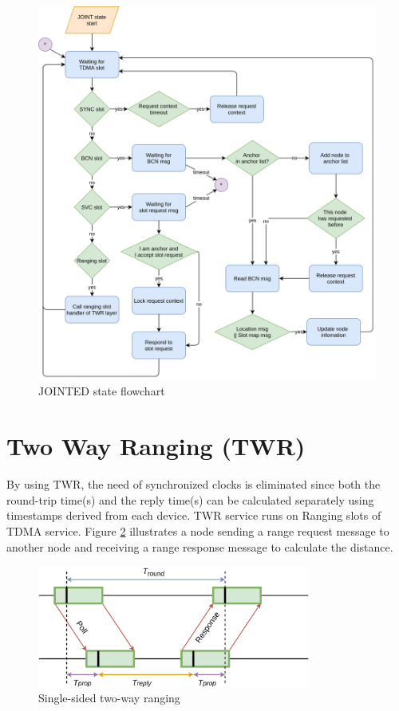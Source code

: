 \documentclass[\main/thesis.tex]{subfiles}
\begin{document}
\begin{figure}[H]
    \begin{center}
        \includegraphics[width=1\textwidth]{JOINTED_state_flow_chart.png}
    \end{center}
    \caption{JOINTED state flowchart}
    \label{fig:JOINTED_state_flowchart}
\end{figure}

\section{Two Way Ranging (TWR)}
By using TWR, the need of synchronized clocks is eliminated since both the round-trip time(s) and the reply time(s) can be calculated separately using timestamps derived from each device. TWR service runs on Ranging slots of TDMA service. Figure \ref{fig:single_sided_two_way_ranging} illustrates a node sending a range request message to another node and receiving a range response message to calculate the distance.

\begin{figure}[H]
    \begin{center}
        \includegraphics[width=0.8\textwidth]{single_sided_two_way_ranging.png}
    \end{center}
    \caption{Single-sided two-way ranging}
    \label{fig:single_sided_two_way_ranging}
\end{figure}
\end{document}

